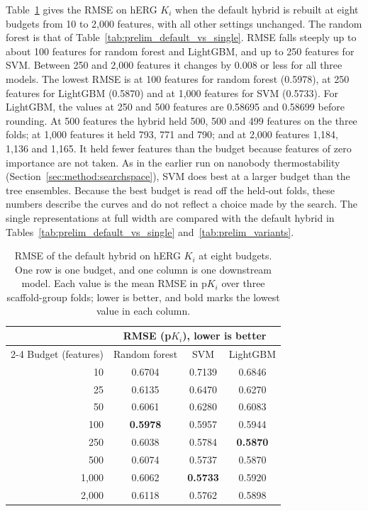 Table~\ref{tab:prelim_budget} gives the RMSE on hERG $K_i$ when the default hybrid is rebuilt at eight budgets from 10 to 2,000 features, with all other settings unchanged. The random forest is that of Table~\ref{tab:prelim_default_vs_single}. RMSE falls steeply up to about 100 features for random forest and LightGBM, and up to 250 features for SVM. Between 250 and 2,000 features it changes by 0.008 or less for all three models. The lowest RMSE is at 100 features for random forest (0.5978), at 250 features for LightGBM (0.5870) and at 1,000 features for SVM (0.5733). For LightGBM, the values at 250 and 500 features are 0.58695 and 0.58699 before rounding. At 500 features the hybrid held 500, 500 and 499 features on the three folds; at 1,000 features it held 793, 771 and 790; and at 2,000 features 1,184, 1,136 and 1,165. It held fewer features than the budget because features of zero importance are not taken. As in the earlier run on nanobody thermostability (Section~\ref{sec:method:searchspace}), SVM does best at a larger budget than the tree ensembles. Because the best budget is read off the held-out folds, these numbers describe the curves and do not reflect a choice made by the search. The single representations at full width are compared with the default hybrid in Tables~\ref{tab:prelim_default_vs_single} and~\ref{tab:prelim_variants}.

\begin{table}[htbp]
\centering
\small
\begin{tabular}{@{}rccc@{}}
\toprule
 & \multicolumn{3}{c}{RMSE (p$K_i$), lower is better} \\
\cmidrule(l){2-4}
Budget (features) & Random forest & SVM & LightGBM \\
\midrule
10 & 0.6704 & 0.7139 & 0.6846 \\
25 & 0.6135 & 0.6470 & 0.6270 \\
50 & 0.6061 & 0.6280 & 0.6083 \\
100 & \textbf{0.5978} & 0.5957 & 0.5944 \\
250 & 0.6038 & 0.5784 & \textbf{0.5870} \\
500 & 0.6074 & 0.5737 & 0.5870 \\
1,000 & 0.6062 & \textbf{0.5733} & 0.5920 \\
2,000 & 0.6118 & 0.5762 & 0.5898 \\
\bottomrule
\end{tabular}
\caption[RMSE of the default hybrid against budget on hERG $K_i$.]{RMSE of the default hybrid on hERG $K_i$ at eight budgets. One row is one budget, and one column is one downstream model. Each value is the mean RMSE in p$K_i$ over three scaffold-group folds; lower is better, and bold marks the lowest value in each column.}
\label{tab:prelim_budget}
\end{table}


